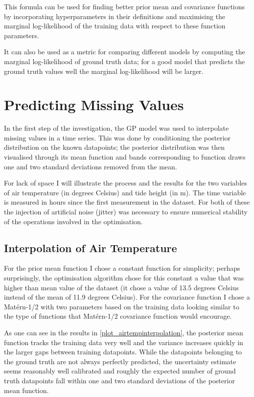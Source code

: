 \documentclass{article}
\begin{document}
            This formula can be used for finding better prior mean and covariance functions by incorporating hyperparameters in their definitions and maximising the marginal log-likelihood of the training data with respect to these function parameters.

            It can also be used as a metric for comparing different models by computing the marginal log-likelihood of ground truth data; for a good model that predicts the ground truth values well the marginal log-likelihood will be larger.

    \section{Predicting Missing Values} \label{sec_interpolation}

            In the first step of the investigation, the GP model was used to interpolate missing values in a time series. This was done by conditioning the posterior distribution on the known datapoints; the posterior distribution was then visualised through its mean function and bands corresponding to function draws one and two standard deviations removed from the mean.
    
            For lack of space I will illustrate the process and the results for the two variables of air temperature (in degrees Celsius) and tide height (in m). The time variable is measured in hours since the first measurement in the dataset. For both of these the injection of artificial noise (jitter) was necessary to ensure numerical stability of the operations involved in the optimisation.
            
            \subsection{Interpolation of Air Temperature}

                For the prior mean function I chose a constant function for simplicity; perhaps surprisingly, the optimisation algorithm chose for this constant a value that was higher than mean value of the dataset (it chose a value of 13.5 degrees Celsius instead of the mean of 11.9 degrees Celsius). For the covariance function I chose a Matérn-1/2 with two parameters based on the training data looking similar to the type of functions that Matérn-1/2 covariance function would encourage.

                As one can see in the results in \cref{plot_airtempinterpolation}, the posterior mean function tracks the training data very well and the variance increases quickly in the larger gaps between training datapoints. While the datapoints belonging to the ground truth are not always perfectly predicted, the uncertainty estimate seems reasonably well calibrated and roughly the expected number of ground truth datapoints fall within one and two standard deviations of the posterior mean function.
\end{document}
